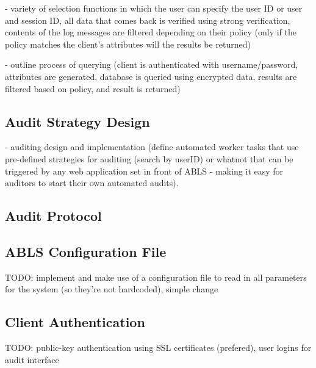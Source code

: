 \documentclass{sig-alternate}
\begin{document}
- variety of selection functions in which the user can specify the user ID or user and session ID, all data that comes back
is verified using strong verification, contents of the log messages are filtered depending on their policy (only if the policy matches the client's attributes will the results be returned)

- outline process of querying (client is authenticated with username/password, attributes are generated, database is queried using encrypted data, results are filtered based on policy, and result is returned)

\subsection{Audit Strategy Design}
- auditing design and implementation (define automated worker tasks that use pre-defined strategies for
auditing (search by userID) or whatnot that can be triggered by any web application set in front of ABLS - 
making it easy for auditors to start their own automated audits). 

\subsection{Audit Protocol}

\subsection{ABLS Configuration File} 
TODO: implement and make use of a configuration file to read in all parameters for the system (so they're not hardcoded), simple change

\subsection{Client Authentication}
TODO: public-key authentication using SSL certificates (prefered), user logins for audit interface

\begin{comment}
\begin{table}
\centering
\caption{Feelings about Issues}
\begin{tabular}{|l|r|l|} \hline
Flavor&Percentage&Comments\\ \hline
Issue 1 &  10\% & Loved it a lot\\ \hline
Issue 2 &  20\% & Disliked it immensely\\ \hline
Issue 3 &  30\% & Didn't care one bit\\ \hline
Issue 4 &  40\% & Duh?\\ \hline
\end{tabular}
\end{table}

\begin{figure}[htb]
\label{sample graphic}
\begin{center}
\texttt{[image: fly.jpg]}
\caption{A sample black \& white graphic (JPG).}
\end{center}
\end{figure}
\end{comment}



\balance
\end{document}
